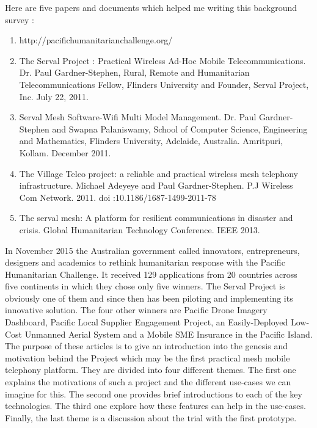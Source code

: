 \documentclass[a4paper, 11pt, oneside]{Thesis}  %
\begin{document}
Here are five papers and documents which helped me writing this background survey :
\begin{enumerate}
\item http://pacifichumanitarianchallenge.org/ 
\item The Serval Project : Practical Wireless Ad-Hoc Mobile Telecommunications. Dr. Paul Gardner-Stephen, Rural, Remote and Humanitarian Telecommunications Fellow, Flinders University and Founder, Serval Project, Inc. July 22, 2011.
\item Serval Mesh Software-Wifi Multi Model Management. Dr. Paul Gardner-Stephen and Swapna Palaniswamy, School of Computer Science, Engineering and Mathematics, Flinders University, Adelaide, Australia. Amritpuri, Kollam. December 2011. 
\item The Village Telco project: a reliable and practical wireless mesh telephony infrastructure. Michael Adeyeye and Paul Gardner-Stephen. P.J Wireless Com Network. 2011. doi :10.1186/1687-1499-2011-78
\item The serval mesh: A platform for resilient communications in disaster and crisis. Global Humanitarian Technology Conference. IEEE 2013.
\end{enumerate}
In November 2015 the Australian government called innovators, entrepreneurs, designers and academics to rethink humanitarian response with the Pacific Humanitarian Challenge. It received 129 applications from 20 countries across five continents in which they chose only five winners. The Serval Project is obviously one of them and since then has been piloting and implementing its innovative solution. The four other winners are Pacific Drone Imagery Dashboard, Pacific Local Supplier Engagement Project, an Easily-Deployed Low-Cost Unmanned Aerial System and a Mobile SME Insurance in the Pacific Island. 
 \\

The purpose of these articles is to give an introduction into the genesis and motivation behind the Project which may be the first practical mesh mobile telephony platform.  They are divided into four different themes. The first one explains the motivations of such a project and the different use-cases we can imagine for this. The second one provides brief introductions to each of the key technologies. The third one explore how these features can help in the use-cases. Finally, the last theme is a discussion about the trial with the first prototype. \par
\end{document}
